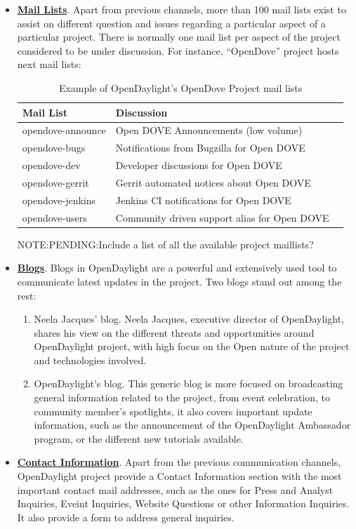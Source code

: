 \documentclass[a4paper, 12pt]{book}
\begin{document}
\begin{itemize}
\item{\textbf{\underline{Mail Lists}}}. Apart from previous channels, more than 100 mail lists exist to assist on different question and issues regarding a particular aspect of a particular project. There is normally one mail list per aspect of the project considered to be under discussion. For instance, ``OpenDove'' project hosts next mail lists:
\begin{table}[H]
\footnotesize
\begin{center}
\begin{tabular}{|l|l|l|}
\hline
\textbf{Mail List} & \textbf{Discussion} \\ \hline
opendove-announce	& Open DOVE Announcements (low volume) \\ \hline
opendove-bugs	& Notifications from Bugzilla for Open DOVE \\ \hline
opendove-dev	& Developer discussions for Open DOVE \\ \hline
opendove-gerrit	& Gerrit automated notices about Open DOVE \\ \hline
opendove-jenkins	& Jenkins CI notifications for Open DOVE \\ \hline
opendove-users	& Community driven support alias for Open DOVE \\ \hline
\end{tabular}
\end{center}
\caption{Example of OpenDaylight's OpenDove Project mail lists}
\label{tab:projectmaillist}
\end{table}
NOTE:PENDING:Include a list of all the available project maillists?
\item{\textbf{\underline{Blogs}}}. Blogs in OpenDaylight are a powerful and extensively used tool to communicate latest updates in the project. Two blogs stand out among the rest:
\begin{enumerate}
\item{Neela Jacques' blog}. Neela Jacques, executive director of OpenDaylight, shares his view on the different threats and opportunities around OpenDaylight project, with high focus on the Open nature of the project and technologies involved.
\item{OpenDaylight's blog}. This generic blog is more focused on broadcasting general information related to the project, from event celebration, to community member's spotlights, it also covers important update information, such as the announcement of the OpenDaylight Ambassador program, or the different new tutorials available.
\end{enumerate}
\item{\textbf{\underline{Contact Information}}}. Apart from the previous communication channels, OpenDaylight project provide a Contact Information section with the most important contact mail addresses, such as the ones for Press and Analyst Inquiries, Eveint Inquiries, Website Questions or other Information Inquiries. It also provide a form to address general inquiries.
\end{itemize}
\end{document}
